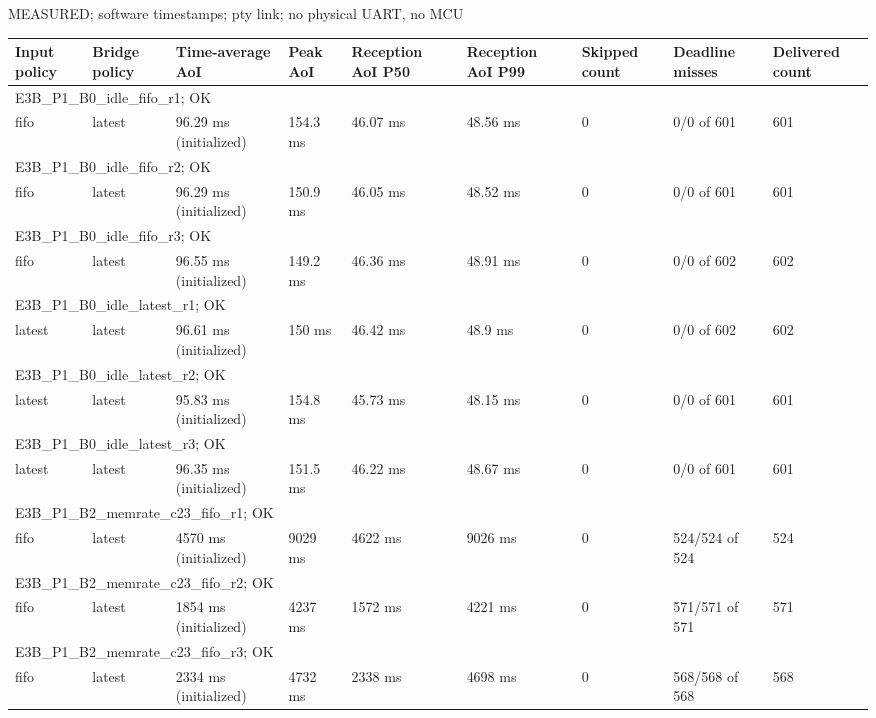 \par\noindent MEASURED; software timestamps; pty link; no physical UART, no MCU\par
\begin{tabular}{lllllllll}
\toprule
Input policy & Bridge policy & Time-average AoI & Peak AoI & Reception AoI P50 & Reception AoI P99 & Skipped count & Deadline misses & Delivered count \\
\midrule
\multicolumn{9}{l}{E3B\_P1\_B0\_idle\_fifo\_r1; OK} \\
fifo & latest & 96.29 ms (initialized) & 154.3 ms & 46.07 ms & 48.56 ms & 0 & 0/0 of 601 & 601 \\
\multicolumn{9}{l}{E3B\_P1\_B0\_idle\_fifo\_r2; OK} \\
fifo & latest & 96.29 ms (initialized) & 150.9 ms & 46.05 ms & 48.52 ms & 0 & 0/0 of 601 & 601 \\
\multicolumn{9}{l}{E3B\_P1\_B0\_idle\_fifo\_r3; OK} \\
fifo & latest & 96.55 ms (initialized) & 149.2 ms & 46.36 ms & 48.91 ms & 0 & 0/0 of 602 & 602 \\
\multicolumn{9}{l}{E3B\_P1\_B0\_idle\_latest\_r1; OK} \\
latest & latest & 96.61 ms (initialized) & 150 ms & 46.42 ms & 48.9 ms & 0 & 0/0 of 602 & 602 \\
\multicolumn{9}{l}{E3B\_P1\_B0\_idle\_latest\_r2; OK} \\
latest & latest & 95.83 ms (initialized) & 154.8 ms & 45.73 ms & 48.15 ms & 0 & 0/0 of 601 & 601 \\
\multicolumn{9}{l}{E3B\_P1\_B0\_idle\_latest\_r3; OK} \\
latest & latest & 96.35 ms (initialized) & 151.5 ms & 46.22 ms & 48.67 ms & 0 & 0/0 of 601 & 601 \\
\multicolumn{9}{l}{E3B\_P1\_B2\_memrate\_c23\_fifo\_r1; OK} \\
fifo & latest & 4570 ms (initialized) & 9029 ms & 4622 ms & 9026 ms & 0 & 524/524 of 524 & 524 \\
\multicolumn{9}{l}{E3B\_P1\_B2\_memrate\_c23\_fifo\_r2; OK} \\
fifo & latest & 1854 ms (initialized) & 4237 ms & 1572 ms & 4221 ms & 0 & 571/571 of 571 & 571 \\
\multicolumn{9}{l}{E3B\_P1\_B2\_memrate\_c23\_fifo\_r3; OK} \\
fifo & latest & 2334 ms (initialized) & 4732 ms & 2338 ms & 4698 ms & 0 & 568/568 of 568 & 568 \\

\end{tabular}

